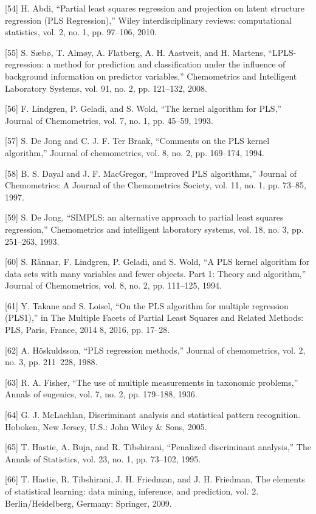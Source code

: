 \documentclass[sn-mathphys-num]{sn-jnl}%
\begin{document}
[54] H. Abdi, “Partial least squares regression and projection on latent structure regression (PLS Regression),” Wiley interdisciplinary reviews: computational statistics, vol. 2, no. 1, pp. 97–106, 2010.

[55] S. Sæbø, T. Almøy, A. Flatberg, A. H. Aastveit, and H. Martens, “LPLS-regression: a method for prediction and classification under the influence of background information on predictor variables,” Chemometrics and Intelligent Laboratory Systems, vol. 91, no. 2, pp. 121–132, 2008.

[56] F. Lindgren, P. Geladi, and S. Wold, “The kernel algorithm for PLS,” Journal of Chemometrics, vol. 7, no. 1, pp. 45–59, 1993.

[57] S. De Jong and C. J. F. Ter Braak, “Comments on the PLS kernel algorithm,” Journal of chemometrics, vol. 8, no. 2, pp. 169–174, 1994.

[58] B. S. Dayal and J. F. MacGregor, “Improved PLS algorithms,” Journal of Chemometrics: A Journal of the Chemometrics Society, vol. 11, no. 1, pp. 73–85, 1997.

[59] S. De Jong, “SIMPLS: an alternative approach to partial least squares regression,” Chemometrics and intelligent laboratory systems, vol. 18, no. 3, pp. 251–263, 1993.

[60] S. Rännar, F. Lindgren, P. Geladi, and S. Wold, “A PLS kernel algorithm for data sets with many variables and fewer objects. Part 1: Theory and algorithm,” Journal of Chemometrics, vol. 8, no. 2, pp. 111–125, 1994.

[61] Y. Takane and S. Loisel, “On the PLS algorithm for multiple regression (PLS1),” in The Multiple Facets of Partial Least Squares and Related Methods: PLS, Paris, France, 2014 8, 2016, pp. 17–28.

[62] A. Höskuldsson, “PLS regression methods,” Journal of chemometrics, vol. 2, no. 3, pp. 211–228, 1988.

[63] R. A. Fisher, “The use of multiple measurements in taxonomic problems,” Annals of eugenics, vol. 7, no. 2, pp. 179–188, 1936.

[64] G. J. McLachlan, Discriminant analysis and statistical pattern recognition. Hoboken, New Jersey, U.S.: John Wiley & Sons, 2005.

[65] T. Hastie, A. Buja, and R. Tibshirani, “Penalized discriminant analysis,” The Annals of Statistics, vol. 23, no. 1, pp. 73–102, 1995.

[66] T. Hastie, R. Tibshirani, J. H. Friedman, and J. H. Friedman, The elements of statistical learning: data mining, inference, and prediction, vol. 2. Berlin/Heidelberg, Germany: Springer, 2009.
\end{document}

